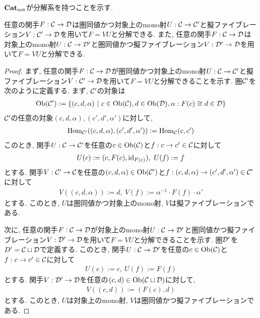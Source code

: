 \documentclass[uplatex, a4paper, 14Q, dvipdfmx]{jsarticle}
\begin{document}
$\mathbf{Cat}_\mathrm{nat}$が分解系を持つことを示す. 

\begin{lemma} \label{prop:Cat_has_fs}
  任意の関手$F : \mathcal{C} \to \mathcal{D}$は圏同値かつ対象上のmono射$U : \mathcal{C} \to \mathcal{C}'$と擬ファイブレーション$V : \mathcal{C}' \to \mathcal{D}$を用いて$F=VU$と分解できる. 
  また, 任意の関手$F : \mathcal{C} \to \mathcal{D}$は対象上のmono射$U : \mathcal{C} \to \mathcal{D}'$と圏同値かつ擬ファイブレーション$V : \mathcal{D}' \to \mathcal{D}$を用いて$F=VU$と分解できる. 
\end{lemma}

\begin{proof}
  まず, 任意の関手$F : \mathcal{C} \to \mathcal{D}$が圏同値かつ対象上のmono射$U : \mathcal{C} \to \mathcal{C}'$と擬ファイブレーション$V : \mathcal{C}' \to \mathcal{D}$を用いて$F=VU$と分解できることを示す. 
  圏$\mathcal{C}'$を次のように定義する. 
  まず, $\mathcal{C}'$の対象は 
  \begin{align*}
    \mathrm{Ob}(\mathcal{C}') := \{(c,d,\alpha) ~|~ c \in \mathrm{Ob}(\mathcal{C}), d \in \mathrm{Ob}(\mathcal{D}), \alpha : F(c) \cong d \in \mathcal{D}\}
  \end{align*}
  $\mathcal{C}'$の任意の対象$(c,d,\alpha), (c',d',\alpha')$に対して, 
  \begin{align*}
    \mathrm{Hom}_{\mathcal{C}'}((c,d,\alpha), (c',d',\alpha')) 
    := \mathrm{Hom}_{\mathcal{C}}(c,c')
  \end{align*}
  このとき, 関手$U : \mathcal{C} \to \mathcal{C}'$を任意の$c \in \mathrm{Ob}(\mathcal{C})$と$f : c \to c' \in \mathcal{C}$に対して
  \begin{align*}
    U(c) := (c,F(c),\mathrm{id}_{F(c)}) ,~ U(f) := f
  \end{align*}
  とする. 
  関手$V : \mathcal{C}' \to \mathcal{C}$を任意の$(c,d,\alpha) \in \mathrm{Ob}(\mathcal{C}')$と$f : (c,d,\alpha) \to (c',d',\alpha') \in \mathcal{C}'$に対して
  \begin{align*}
    V((c,d,\alpha)) := d ,~ V(f) := \alpha^{-1} \cdot F(f) \cdot \alpha'
  \end{align*}
  とする. 
  このとき, $U$は圏同値かつ対象上のmono射, $V$は擬ファイブレーションである.

  次に, 任意の関手$F : \mathcal{C} \to \mathcal{D}$が対象上のmono射$U : \mathcal{C} \to \mathcal{D}'$と圏同値かつ擬ファイブレーション$V : \mathcal{D}' \to \mathcal{D}$を用いて$F=VU$と分解できることを示す. 
  圏$\mathcal{D}'$を$D' = \mathcal{C} \sqcup \mathcal{D}$で定義する. 
  このとき, 関手$U : \mathcal{C} \to \mathcal{D}'$を任意の$c \in \mathrm{Ob}(\mathcal{C})$と$f : c \to c' \in \mathcal{C}$に対して
  \begin{align*}
    U(c) := c, ~ U(f) := F(f)
  \end{align*}
  とする. 
  関手$V : \mathcal{D}' \to \mathcal{D}$を任意の$(c,d) \in \mathrm{Ob}(\mathcal{C} \sqcup \mathcal{D})$に対して, 
  \begin{align*}
    V((c,d)) := (F(c),d)
  \end{align*}
  とする. 
  このとき, $U$は対象上のmono射, $V$は圏同値かつ擬ファイブレーションである. 
\end{proof}
\end{document}
